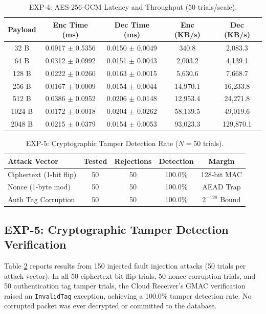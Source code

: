 \documentclass[journal,10pt,twocolumn]{article}
\begin{document}
\begin{table}[t]
\caption{EXP-4: AES-256-GCM Latency and Throughput (50 trials/scale).}
\centering
\small
\begin{tabular}{ccccc}
\toprule
\textbf{Payload} & \textbf{Enc Time (ms)} & \textbf{Dec Time (ms)} & \textbf{Enc (KB/s)} & \textbf{Dec (KB/s)} \\
\midrule
32 B & 0.0917 $\pm$ 0.5356 & 0.0150 $\pm$ 0.0049 & 340.8 & 2,083.3 \\
64 B & 0.0312 $\pm$ 0.0992 & 0.0151 $\pm$ 0.0043 & 2,003.2 & 4,139.1 \\
128 B & 0.0222 $\pm$ 0.0260 & 0.0163 $\pm$ 0.0015 & 5,630.6 & 7,668.7 \\
256 B & 0.0167 $\pm$ 0.0009 & 0.0154 $\pm$ 0.0044 & 14,970.1 & 16,233.8 \\
512 B & 0.0386 $\pm$ 0.0952 & 0.0206 $\pm$ 0.0148 & 12,953.4 & 24,271.8 \\
1024 B & 0.0172 $\pm$ 0.0018 & 0.0204 $\pm$ 0.0262 & 58,139.5 & 49,019.6 \\
2048 B & 0.0215 $\pm$ 0.0379 & 0.0154 $\pm$ 0.0053 & 93,023.3 & 129,870.1 \\
\bottomrule
\end{tabular}
\label{tab:exp4}
\end{table}

\begin{table}[t]
\caption{EXP-5: Cryptographic Tamper Detection Rate ($N=50$ trials).}
\centering
\small
\begin{tabular}{lcccc}
\toprule
\textbf{Attack Vector} & \textbf{Tested} & \textbf{Rejections} & \textbf{Detection} & \textbf{Margin} \\
\midrule
Ciphertext (1-bit flip) & 50 & 50 & 100.0\% & 128-bit MAC \\
Nonce (1-byte mod) & 50 & 50 & 100.0\% & AEAD Trap \\
Auth Tag Corruption & 50 & 50 & 100.0\% & $2^{-128}$ Bound \\
\bottomrule
\end{tabular}
\label{tab:exp5}
\end{table}

\subsection{EXP-5: Cryptographic Tamper Detection Verification}
Table \ref{tab:exp5} reports results from 150 injected fault injection attacks (50 trials per attack vector). In all 50 ciphertext bit-flip trials, 50 nonce corruption trials, and 50 authentication tag tamper trials, the Cloud Receiver's GMAC verification raised an \texttt{InvalidTag} exception, achieving a 100.0\% tamper detection rate. No corrupted packet was ever decrypted or committed to the database.
\end{document}
